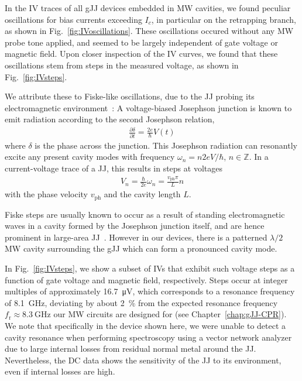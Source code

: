 In the IV traces of all gJJ devices embedded in MW cavities, we found peculiar oscillations for bias currents exceeding $I_c$, in particular on the retrapping branch, as shown in Fig.~\ref{fig:IVoscillations}.
%
These oscillations occured without any MW probe tone applied, and seemed to be largely independent of gate voltage or magnetic field.
%
Upon closer inspection of the IV curves, we found that these oscillations stem from steps in the measured voltage, as shown in Fig.~\ref{fig:IVsteps}.

We attribute these to Fiske-like oscillations, due to the JJ probing its electromagnetic environment~\cite{fiskeTemperatureMagneticField1964,eckSelfDetectionAcJosephson1964,coonJosephsonAcStep1965}:
%
A voltage-biased Josephson junction is known to emit radiation according to the second Josephson relation,
%
\begin{align}
\frac{\partial \delta}{\partial t}=\frac{2e}{\hbar}V(t)
\end{align}
%
where $\delta$ is the phase across the junction.
%
This Josephson radiation can resonantly excite any present cavity modes with frequency $\omega_n=n2eV/\hbar$, $n\in\mathbb{Z}$.
%
In a current-voltage trace of a JJ, this results in steps at voltages
%
\begin{align}
V_n=\frac{\hbar}{2e}\omega_n=\frac{v_\text{ph}\pi}{L}n
\end{align}
%
with the phase velocity $v_\text{ph}$ and the cavity length $L$.

Fiske steps are usually known to occur as a result of standing electromagnetic waves in a cavity formed by the Josephson junction itself, and are hence prominent in large-area JJ~\cite{krasnovFiskeStepsIntrinsic1999,kimFiskeStepsStudied2005,yabukiSupercurrentVanWaals2016b,liHighQualityEpitaxialMgB22017}.
%
However in our devices, there is a patterned $\lambda/2$ MW cavity surrounding the gJJ which can form a pronounced cavity mode.


In Fig.~\ref{fig:IVsteps}, we show a subset of IVs that exhibit such voltage steps as a function of gate voltage and magnetic field, respectively.
%
Steps occur at integer multiples of approximately \SI{16.7}{\micro\volt}, which corresponds to a resonance frequency of \SI{8.1}{\giga\hertz}, deviating by about \SI{2}{\percent} from the expected resonance frequency $f_\text{r}\approx\SI{8.3}{\giga\hertz}$ our MW circuits are designed for (see Chapter~\ref{chap:gJJ-CPR}).
%
We note that specifically in the device shown here, we were unable to detect a cavity resonance when performing spectroscopy using a vector network analyzer due to large internal losses from residual normal metal around the JJ.
%
Nevertheless, the DC data shows the sensitivity of the JJ to its environment, even if internal losses are high.

